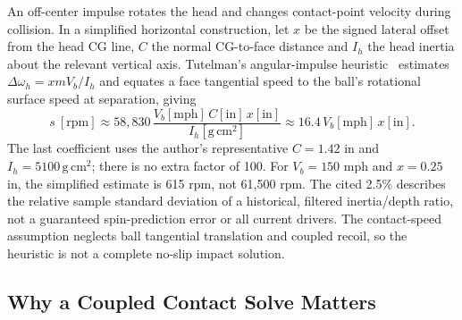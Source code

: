 An off-center impulse rotates the head and changes contact-point velocity during collision.
In a simplified horizontal construction, let $x$ be the signed lateral offset from the head CG line, $C$ the normal CG-to-face distance and $I_h$ the head inertia about the relevant vertical axis.
Tutelman's angular-impulse heuristic~\cite{tutelmangear} estimates $\Delta\omega_h=xmV_b/I_h$ and equates a face tangential speed to the ball's rotational surface speed at separation, giving
\begin{equation}
\label{eq:gear}
s\ [\mathrm{rpm}]\approx58{,}830\,
 \frac{V_b[\mathrm{mph}]\,C[\mathrm{in}]\,x[\mathrm{in}]}
 {I_h[\mathrm{g\,cm^2}]}
 \approx16.4\,V_b[\mathrm{mph}]\,x[\mathrm{in}].
\end{equation}
The last coefficient uses the author's representative $C=1.42$ in and $I_h=5100\,\mathrm{g\,cm^2}$; there is no extra factor of 100.
For $V_b=150$ mph and $x=0.25$ in, the simplified estimate is 615 rpm, not 61,500 rpm.
The cited 2.5\% describes the relative sample standard deviation of a historical, filtered inertia/depth ratio, not a guaranteed spin-prediction error or all current drivers.
The contact-speed assumption neglects ball tangential translation and coupled recoil, so the heuristic is not a complete no-slip impact solution.

\subsection{Why a Coupled Contact Solve Matters}


